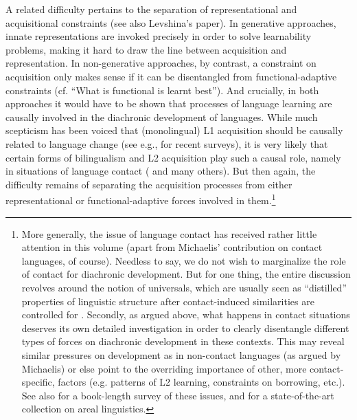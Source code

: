 \documentclass[output=paper]{langsci/langscibook}
\begin{document}
A related difficulty pertains to the separation of representational and acquisitional constraints (see also Levshina’s paper). In generative approaches, innate representations are invoked precisely in order to solve learnability problems, making it hard to draw the line between acquisition and representation. In non-generative approaches, by contrast, a constraint on acquisition only makes sense if it can be disentangled from functional-adaptive constraints (cf. “What is functional is learnt best”). And crucially, in both approaches it would have to be shown that processes of language learning are causally involved in the diachronic development of languages. While much scepticism has been voiced that (monolingual) L1 acquisition should be causally related to language change (see e.g., \citealt{Croft2000,HeineKuteva2007,Diessel2011} for recent surveys), it is very likely that certain forms of bilingualism and L2 acquisition play such a causal role, namely in situations of language contact (\citealt{Matras2009,MeiselEtAl2013,Gast2017} and many others). But then again, the difficulty remains of separating the acquisition processes from either representational or functional-adaptive forces involved in them.\footnote{More generally, the issue of language contact has received rather little attention in this volume (apart from Michaelis’ contribution on contact languages, of course). Needless to say, we do not wish to marginalize the role of contact for diachronic development. But for one thing, the entire discussion revolves around the notion of universals, which are usually seen as “distilled” properties of linguistic structure after contact-induced similarities are controlled for \citep{Bickel2011}. Secondly, as argued above, what happens in contact situations deserves its own detailed investigation in order to clearly disentangle different types of forces on diachronic development in these contexts. This may reveal similar pressures on development as in non-contact languages (as argued by Michaelis) or else point to the overriding importance of other, more contact-specific, factors (e.g. patterns of L2 learning, constraints on borrowing, etc.). See also \citet{Matras2009} for a book-length survey of these issues, and \citet{Hickey2017} for a state-of-the-art collection on areal linguistics.}
\end{document}
